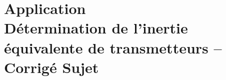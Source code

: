 \chapter*{Application  \\ 
Détermination de l'inertie équivalente de transmetteurs -- \ifprof Corrigé \else Sujet \fi}

\iflivret {} \else
\ifprof  {} \else \fi
\fi

\newcommand{\repappli}{\repRel/PSI_ExercicesCompetences/TEC/TEC-04-Meq-Jeq/}
\newcommand{\appli}{23_TrainSimple}

\renewcommand{\nomExo}{Cy_05_01_Application_00_Reducteurs}

\renewcommand{\appli}{23_TrainSimple}
\graphicspath{{\repStyle/png}{\repappli\appli/images}}


%



\renewcommand{\appli}{38_Treuil}
\graphicspath{{\repStyle/png}{\repappli\appli/images}}


\renewcommand{\appli}{36_VisEcrou}
\graphicspath{{\repStyle/png}{\repappli\appli/images}}


\renewcommand{\appli}{94_Taurus}
\graphicspath{{\repStyle/png}{\repappli\appli/images}}




\renewcommand{\appli}{34_ControlX}
\graphicspath{{\repStyle/png}{\repappli\appli/images}}


\newpage

\renewcommand{\appli}{33_Centrifugeuse}
\graphicspath{{\repStyle/png}{\repappli\appli/images}}



